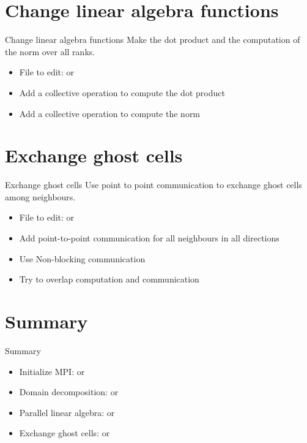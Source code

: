 \documentclass[aspectratio=43]{beamer}
\begin{document}
\section{Change linear algebra functions}
\begin{frame}[fragile]{Change linear algebra functions}
Make the dot product and the computation of the norm over all ranks.
\begin{itemize}
\item File to edit:  or 
\item Add a collective operation to compute the dot product
\item Add a collective operation to compute the norm
\end{itemize}
\end{frame}

\section{Exchange ghost cells}
\begin{frame}[fragile]{Exchange ghost cells}
Use point to point communication to exchange ghost cells among neighbours.
\begin{itemize}
\item File to edit:  or 
\item Add point-to-point communication for all neighbours in all directions
\item Use Non-blocking communication
\item Try to overlap computation and communication
\end{itemize}
\end{frame}

\section{Summary}
\begin{frame}[fragile]{Summary}
\begin{itemize}
\item Initialize MPI:  or 
\item Domain decomposition:  or 
\item Parallel linear algebra:  or 
\item Exchange ghost cells:  or 
\end{itemize}
\end{frame}

\end{document}
